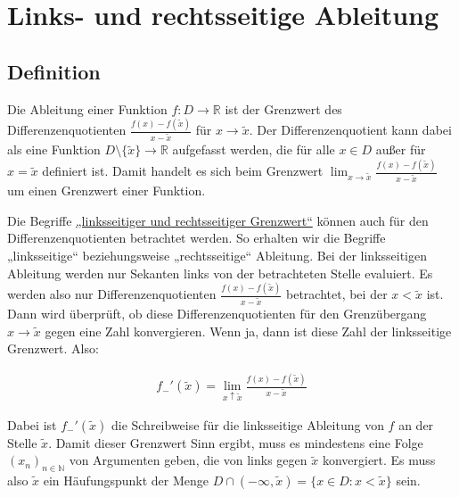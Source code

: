 \documentclass[fontsize=9pt,
               parskip=half-,
               DIV=14,
               listof=chapterentry,
               tocflat]{scrbook}
\begin{document}
\section{Links- und rechtsseitige Ableitung}

\subsection{Definition}

Die Ableitung einer Funktion $f:D\to \mathbb {R} $ ist der Grenzwert des Differenzenquotienten ${\tfrac {f(x)-f({\tilde {x}})}{x-{\tilde {x}}}}$ für $x\to {\tilde {x}}$. Der Differenzenquotient kann dabei als eine Funktion $D\setminus \{{\tilde {x}}\}\to \mathbb {R} $ aufgefasst werden, die für alle $x\in D$ außer für $x={\tilde {x}}$ definiert ist. Damit handelt es sich beim Grenzwert $\lim _{x\to {\tilde {x}}}{\tfrac {f(x)-f({\tilde {x}})}{x-{\tilde {x}}}}$ um einen Grenzwert einer Funktion.

Die Begriffe \href{https://de.wikibooks.org/wiki/Mathe\_für\_Nicht-Freaks:\_Grenzwert\_von\_Funktionen}
{„linksseitiger und rechtsseitiger Grenzwert“} können auch für den Differenzenquotienten betrachtet werden. So erhalten wir die Begriffe „linksseitige“ beziehungsweise „rechtsseitige“ Ableitung. Bei der linksseitigen Ableitung werden nur Sekanten links von der betrachteten Stelle evaluiert. Es werden also nur Differenzenquotienten ${\tfrac {f(x)-f({\tilde {x}})}{x-{\tilde {x}}}}$ betrachtet, bei der $x<{\tilde {x}}$ ist. Dann wird überprüft, ob diese Differenzenquotienten für den Grenzübergang $x\to {\tilde {x}}$ gegen eine Zahl konvergieren. Wenn ja, dann ist diese Zahl der linksseitige Grenzwert. Also:

\begin{align*}
{f_{-}}'({\tilde {x}})=\lim _{x\uparrow {\tilde {x}}}{\frac {f(x)-f({\tilde {x}})}{x-{\tilde {x}}}}
\end{align*}

Dabei ist ${f_{-}}'({\tilde {x}})$ die Schreibweise für die linksseitige Ableitung von $f$ an der Stelle ${\tilde {x}}$. Damit dieser Grenzwert Sinn ergibt, muss es mindestens eine Folge $(x_{n})_{n\in \mathbb {N} }$ von Argumenten geben, die von links gegen ${\tilde {x}}$ konvergiert. Es muss also ${\tilde {x}}$ ein Häufungspunkt der Menge $D\cap (-\infty ,{\tilde {x}})=\{x\in D:x<{\tilde {x}}\}$ sein.
\end{document}
